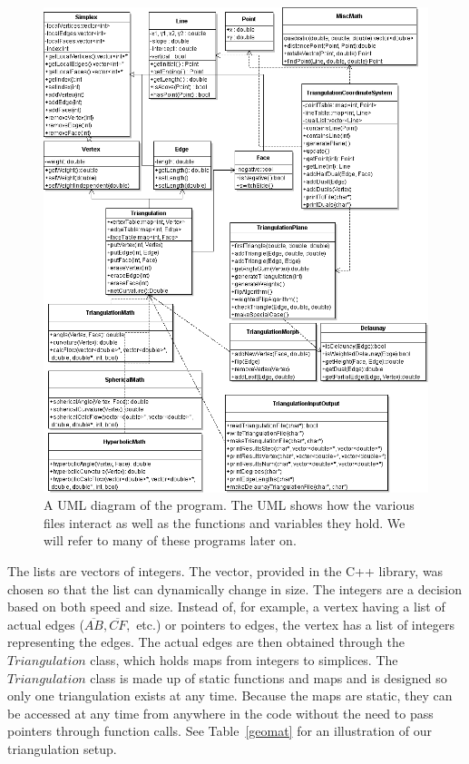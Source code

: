 \documentclass[12pt]{article}
\begin{document}
\begin{figure}
\begin{center}
\includegraphics[scale = 0.47]{Pictures/triangulationUML.png}
\end{center}
\caption{A UML diagram of the program. The UML shows how the various files interact as well as the functions and variables they hold. We will refer to many of these programs later on.}
\label{triUML}
\end{figure}

\noindent The lists are vectors of integers. The vector, provided in the C++ library, was chosen so that the list can dynamically change in size. The integers are a decision based on both speed and size. Instead of, for example, a vertex having a list of actual edges ($\overline{AB}, \overline{CF},$ etc.) or pointers to edges, the vertex has a list of integers representing the edges. The actual edges are then obtained through the $Triangulation$ class, which holds maps from integers to simplices. The $Triangulation$ class is made up of static functions and maps and is designed so only one triangulation exists at any time. Because the maps are static, they can be accessed at any time from anywhere in the code without the need to pass pointers through function calls. See Table~\ref{geomat} for an illustration of our triangulation setup.\newline
\end{document}
